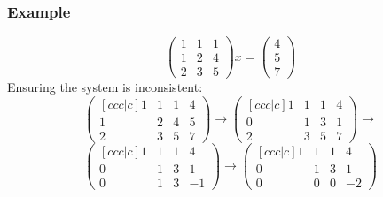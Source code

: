 \documentclass{beamer}
\begin{document}
\begin{frame}
\frametitle{Example}
	$$\begin{pmatrix} 1 & 1 & 1 \\ 1 & 2 & 4 \\ 2 & 3 & 5 \end{pmatrix}x = \begin{pmatrix} 4\\ 5 \\ 7 \end{pmatrix}$$
		 \pause
		Ensuring the system is inconsistent: 
		$$ \begin{pmatrix}[ccc|c] 1 & 1 & 1 & 4 \\ 1 & 2 & 4 & 5 \\ 2 & 3 & 5 & 7 \end{pmatrix} 
				 \rightarrow
			 \begin{pmatrix}[ccc|c] 1 & 1 & 1 & 4 \\ 0 & 1 & 3 & 1 \\ 2 & 3 & 5 & 7 \end{pmatrix} \rightarrow$$
			$$
                         \begin{pmatrix}[ccc|c] 1 & 1 & 1 & 4 \\ 0 & 1 & 3 & 1 \\ 0 & 1 & 3 & -1 \end{pmatrix}
				 \rightarrow
                         \begin{pmatrix}[ccc|c] 1 & 1 & 1 & 4 \\ 0 & 1 & 3 & 1 \\ 0 & 0 & 0 & -2 \end{pmatrix} $$

\end{frame}
\end{document}
